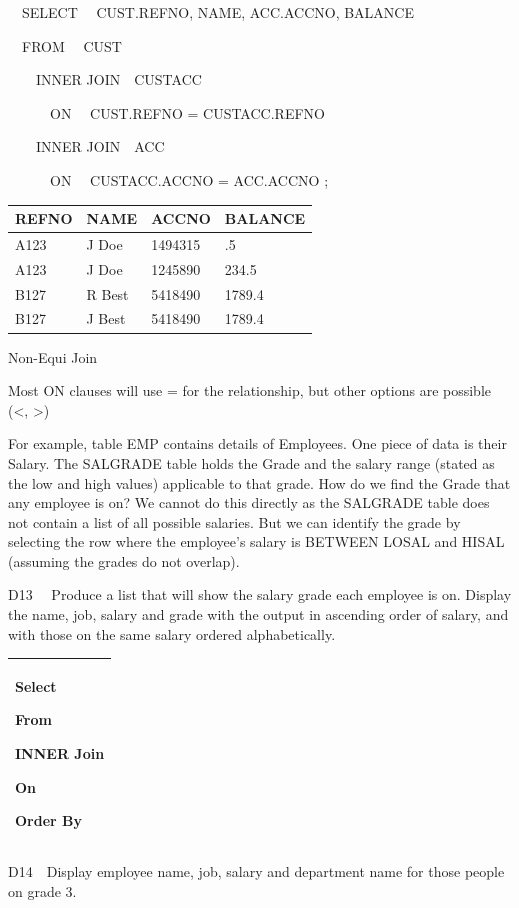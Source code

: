  \ \ SELECT \ \ CUST.REFNO, NAME, ACC.ACCNO, BALANCE

\ \ FROM \ \ CUST  

\ \ \ \ INNER JOIN\ \ CUSTACC 

\ \ \ \ \ \ ON \ \ CUST.REFNO = CUSTACC.REFNO

\ \ \ \ INNER JOIN\ \ ACC 

\ \ \ \ \ \ ON \ \ CUSTACC.ACCNO = ACC.ACCNO ;



\begin{center}
\begin{minipage}{10.075cm}
\begin{flushleft}
\tablefirsthead{}
\tablehead{}
\tabletail{}
\tablelasttail{}
\begin{supertabular}{|m{1.742cm}|m{2.55cm}|m{2.552cm}|m{2.43cm}|}
\hline
REFNO &
NAME &
ACCNO &
BALANCE\\\hline
A123 &
J Doe &
1494315 &
.5\\\hline
A123 &
J Doe &
1245890 &
234.5\\\hline
B127 &
R Best &
5418490 &
1789.4\\\hline
B127 &
J Best &
5418490 &
1789.4\\
\end{supertabular}
\end{flushleft}
\end{minipage}
\end{center}
Non-Equi Join

Most ON clauses will use = for the relationship, but other options are possible ({\textless}, {\textgreater})

For example, table EMP contains details of Employees.  One piece of data is their Salary.  The SALGRADE table holds the Grade and the salary range (stated as the low and high values) applicable to that grade.  How do we find the Grade that any employee is on?  We cannot do this directly as the SALGRADE table does not contain a list of all possible salaries.  But we can identify the grade by selecting the row where the employee's salary is BETWEEN LOSAL and HISAL (assuming the grades do not overlap).

D13  \ \ Produce a list that will show the salary grade each employee is on.  Display the name, job, salary and grade with the output in ascending order of salary, and with those on the same salary ordered alphabetically.

\begin{flushleft}
\tablefirsthead{}
\tablehead{}
\tabletail{}
\tablelasttail{}
\begin{supertabular}{|m{14.793cm}|}
\hline
Select

From

INNER Join

On

Order By\\\hline
\end{supertabular}
\end{flushleft}
D14\ \ Display employee name, job, salary and department name for those people on grade 3.



